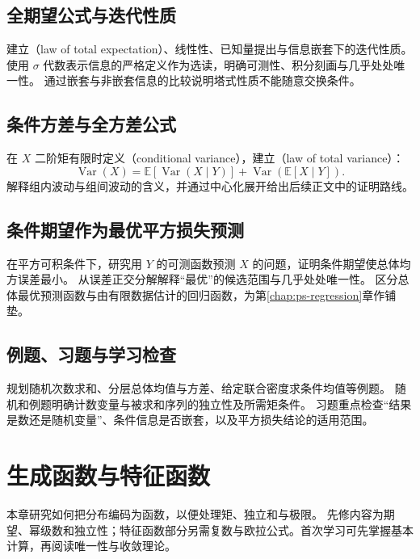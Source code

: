 \documentclass[UTF8,12pt,a4paper,fontset=fandol]{ctexbook}
\begin{document}
\section{全期望公式与迭代性质}
\label{sec:ps-tower-property}
建立（law of total expectation）、线性性、已知量提出与信息嵌套下的迭代性质。
使用 $\sigma$ 代数表示信息的严格定义作为选读，明确可测性、积分刻画与几乎处处唯一性。
通过嵌套与非嵌套信息的比较说明塔式性质不能随意交换条件。

\section{条件方差与全方差公式}
\label{sec:ps-total-variance}
在 $X$ 二阶矩有限时定义（conditional variance），建立（law of total variance）：
\begin{equation}
  \operatorname{Var}(X)
  =\mathbb E[\operatorname{Var}(X\mid Y)]
  +\operatorname{Var}(\mathbb E[X\mid Y]).
  \label{eq:ps-total-variance}
\end{equation}
解释组内波动与组间波动的含义，并通过中心化展开给出后续正文中的证明路线。

\section{条件期望作为最优平方损失预测}
\label{sec:ps-conditional-prediction}
在平方可积条件下，研究用 $Y$ 的可测函数预测 $X$ 的问题，证明条件期望使总体均方误差最小。
从误差正交分解解释“最优”的候选范围与几乎处处唯一性。
区分总体最优预测函数与由有限数据估计的回归函数，为第\ref{chap:ps-regression}章作铺垫。

\section{例题、习题与学习检查}
规划随机次数求和、分层总体均值与方差、给定联合密度求条件均值等例题。
随机和例题明确计数变量与被求和序列的独立性及所需矩条件。
习题重点检查“结果是数还是随机变量”、条件信息是否嵌套，以及平方损失结论的适用范围。


\chapter{生成函数与特征函数}
\label{chap:ps-generating-functions}

本章研究如何把分布编码为函数，以便处理矩、独立和与极限。
先修内容为期望、幂级数和独立性；特征函数部分另需复数与欧拉公式。首次学习可先掌握基本计算，再阅读唯一性与收敛理论。
\end{document}
